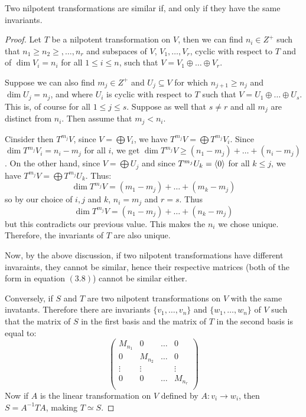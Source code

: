 \begin{theorem}\label{3.4.14}
    Two nilpotent transformations are similar if, and only if they have the
    same invariants.
\end{theorem}
\begin{proof}
    Let $T$ be a nilpotent transformation on  $V$, then we can find  $n_i \in
    Z^+$ such that  $n_1 \geq n_2 \geq, \dots, n_r$ and subspaces of $V$,
    $V_1, \dots, V_r$, cyclic with respect to $T$ and of  $\dim{V_i}=n_i$ for
    all $1 \leq i \leq n$, such that  $V=V_1 \oplus \dots \oplus V_r$.

    Suppose we can also find $m_j \in Z^+$ and  $U_j \subseteq V$ for which
    $n_{j+1} \geq n_j$ and $\dim{U_j}=n_j$, and where $U_i$ is cyclic with
    respect to  $T$ such that  $V=U_1 \oplus \dots \oplus U_s$. This is, of
    course for all $1 \leq j \leq s$. Suppose as well that  $s \neq r$ and all
     $m_j$ are distinct from  $n_i$. Then assume that  $m_j<n_i$.

     Cinsider then  $T^{m_j}V$, since $V=\bigoplus{V_i}$, we have
     $T^{m_j}V=\bigoplus{T^{m_j}V_i}$. Since $\dim{T^{m_j}V_i}=n_i-m_j$ for all
     $i$, we get  $\dim{T^{m_j}V} \geq (n_1-m_j)+\dots+(n_i-m_j)$. On the other
     hand, since $V=\bigoplus{U_j}$ and since $T^{m_j}U_k=\langle 0\rangle$ for all
     $k \leq j$, we have  $T^{m_j}V=\bigoplus{T^{m_j}U_k}$. Thus:
        \begin{equation*}
            \dim{T^{m_j}V}=(m_1-m_j)+\dots+(m_k-m_j)
        \end{equation*}
    so by our choice of $i,j$ and $k$, $n_i=m_j$ and  $r=s$. Thus
        \begin{equation*}
            \dim{T^{m_j}V}=(n_1-m_j)+\dots+(n_k-m_j)
        \end{equation*}
    but this contradicts our previous value. This makes the $n_i$ we chose
    unique. Therefore, the invariants of  $T$ are also unique.

    Now, by the above discussion, if two nilpotent transformations have
    different invaraints, they cannot be similar, hence their respective
    matrices (both of the form in equation $(3.8)$) cannot be similar either.

    Conversely, if $S$ and  $T$ are two nilpotent transformations on  $V$ with
    the same invatants. Therefore there are invariants  $\{v_1, \dots, v_n\}$
    and $\{w_1, \dots, w_n\}$ of $V$ such that the matrix of  $S$ in the first
    basis and the matrix of  $T$ in the second basis is equal to:
        \begin{equation*}
        \begin{pmatrix}
            M_{n_1}     &   0   & \dots &   0   \\
            0       &   M_{n_2} &   \dots   &   0   \\
            \vdots  &   \vdots  &   &   \vdots  \\
            0       &   0   &   \dots   &   M_{n_r} \\
        \end{pmatrix}
        \end{equation*}
    Now if $A$ is the linear transformation on  $V$ defined by  $A:v_i
    \rightarrow w_i$, then $S=A^{-1}TA$, making $T \simeq S$.
\end{proof}
